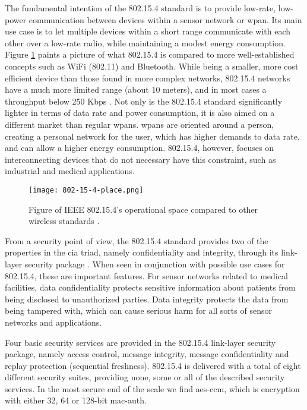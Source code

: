 The fundamental intention of the 802.15.4 standard is to provide low-rate, low-power communication between devices within a sensor network or \gls{wpan}. Its main use case is to let multiple devices within a short range communicate with each other over a low-rate radio, while maintaining a modest energy consumption. Figure \ref{fig:802154-figure} paints a picture of what 802.15.4 is compared to more well-established concepts such as WiFi (802.11) and Bluetooth. While being a smaller, more cost efficient device than those found in more complex networks, 802.15.4 networks have a much more limited range (about 10 meters), and in most cases a throughput below 250 Kbps \cite{gutierrez2001ieee}. Not only is the 802.15.4 standard significantly lighter in terms of data rate and power consumption, it is also aimed on a different market than regular \gls{wpan}s. \gls{wpan}s are oriented around a person, creating a personal network for the user, which has higher demands to data rate, and can allow a higher energy consumption. 802.15.4, however, focuses on interconnecting devices that do not necessary have this constraint, such as industrial and medical applications. 


\begin{figure}
	\centering
	\texttt{[image: 802-15-4-place.png]}
	\caption{Figure of IEEE 802.15.4's operational space compared to other wireless standards \cite{gutierrez2001ieee}.}
	\label{fig:802154-figure}
\end{figure}


From a security point of view, the 802.15.4 standard provides two of the properties in the \gls{cia} triad, namely confidentiality and integrity, through its link-layer security package \cite{sastry2004security}. When seen in conjunction with possible use cases for 802.15.4, these are important features. For sensor networks related to medical facilities, data confidentiality protects sensitive information about patients from being disclosed to unauthorized parties. Data integrity protects the data from being tampered with, which can cause serious harm for all sorts of sensor networks and applications.


Four basic security services are provided in the 802.15.4 link-layer security package, namely access control, message integrity, message confidentiality and replay protection (sequential freshness). 802.15.4 is delivered with a total of eight different security suites, providing none, some or all of the described security services. In the most secure end of the scale we find \gls{aes}-\gls{ccm}, which is encryption with either 32, 64 or 128-bit \gls{mac-auth}. 

